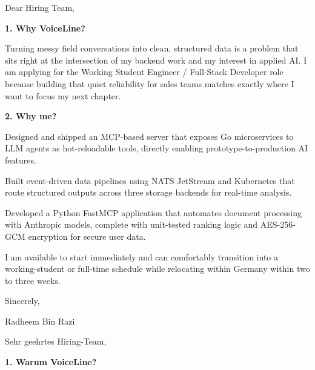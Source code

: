 \documentclass[11pt,a4paper]{coverletter}
\begin{document}

\opening{Dear Hiring Team,}

\vspace{8pt}\noindent\textbf{1. Why VoiceLine?}\par\vspace{3pt}

Turning messy field conversations into clean, structured data is a problem that sits right at the intersection of my backend work and my interest in applied AI. I am applying for the Working Student Engineer / Full-Stack Developer role because building that quiet reliability for sales teams matches exactly where I want to focus my next chapter.

\vspace{8pt}\noindent\textbf{2. Why me?}\par\vspace{3pt}

\bullets

  \item Designed and shipped an MCP-based server that exposes Go microservices to LLM agents as hot-reloadable tools, directly enabling prototype-to-production AI features.

  \item Built event-driven data pipelines using NATS JetStream and Kubernetes that route structured outputs across three storage backends for real-time analysis.

  \item Developed a Python FastMCP application that automates document processing with Anthropic models, complete with unit-tested ranking logic and AES-256-GCM encryption for secure user data.

\bulletsend

I am available to start immediately and can comfortably transition into a working-student or full-time schedule while relocating within Germany within two to three weeks.

\closing{Sincerely,}{Radheem Bin Razi}

\clearpage
{}


\opening{Sehr geehrtes Hiring-Team,}

\vspace{8pt}\noindent\textbf{1. Warum VoiceLine?}\par\vspace{3pt}
\end{document}
